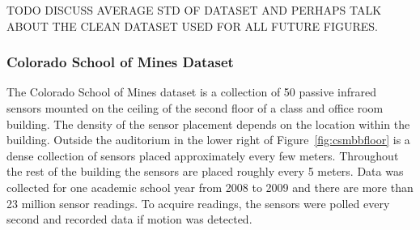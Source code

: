 TODO DISCUSS AVERAGE STD OF DATASET AND PERHAPS TALK ABOUT THE CLEAN DATASET USED FOR ALL FUTURE FIGURES.

\subsubsection{Colorado School of Mines Dataset}

The Colorado School of Mines dataset is a collection of 50 passive infrared sensors mounted on the ceiling of the second floor of a class and office room building.  The density of the sensor placement depends on the location within the building.  Outside the auditorium in the lower right of Figure~\ref{fig:csmbbfloor} is a dense collection of sensors placed approximately every few meters.  Throughout the rest of the building the sensors are placed roughly every 5 meters.  Data was collected for one academic school year from 2008 to 2009 and there are more than 23 million sensor readings.  To acquire readings, the sensors were polled every second and recorded data if motion was detected.  




